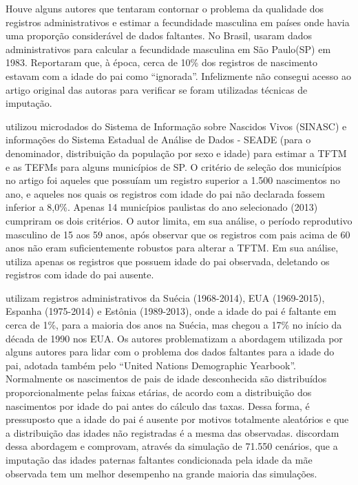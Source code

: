 Houve alguns autores que tentaram contornar o problema da qualidade dos registros administrativos e estimar a fecundidade masculina em países onde havia uma proporção considerável de dados faltantes. No Brasil,  usaram dados administrativos para calcular a fecundidade
masculina em São Paulo(SP) em 1983. Reportaram que, à época, cerca de 10\% dos registros de nascimento estavam com a idade do pai como “ignorada”. Infelizmente não consegui acesso ao artigo original das autoras para verificar se foram utilizadas técnicas de imputação. 

 utilizou microdados do Sistema de Informação sobre Nascidos Vivos (SINASC) e informações do Sistema Estadual de Análise de Dados - SEADE (para o denominador, distribuição da população por sexo e idade) para estimar a TFTM e as TEFMs para alguns municípios de SP. O critério de seleção dos municípios no artigo foi aqueles que possuíam um registro superior a 1.500 nascimentos no ano, e aqueles nos quais os registros com idade do pai não declarada fossem inferior a 8,0\%. Apenas 14 municípios paulistas do ano selecionado (2013) cumpriram os dois critérios. O autor limita, em sua análise, o período reprodutivo masculino de 15 aos 59 anos, após observar que os registros com pais acima de 60 anos não eram suficientemente robustos para alterar a TFTM. Em sua análise,  utiliza apenas os registros que possuem idade do pai observada, deletando os registros com idade do pai ausente.    

 utilizam registros administrativos da
Suécia (1968-2014), EUA (1969-2015), Espanha (1975-2014) e Estônia (1989-2013), onde a idade do pai é faltante em cerca de 1\%, para a maioria dos anos na Suécia, mas chegou a 17\% no início da década de 1990 nos EUA. Os autores problematizam a abordagem utilizada por alguns autores para lidar com o problema dos dados faltantes para a idade do pai, adotada também pelo “United Nations Demographic Yearbook”\cite{unstatsu2022Nota}. Normalmente os nascimentos de pais de idade desconhecida são distribuídos proporcionalmente pelas faixas etárias, de acordo com a distribuição dos nascimentos por idade do pai antes do cálculo das taxas. Dessa forma, é pressuposto que a idade do pai é ausente por motivos totalmente aleatórios e que a distribuição das idades não registradas é a mesma das observadas.  discordam dessa abordagem e comprovam, através da simulação de 71.550 cenários, que a imputação das idades paternas faltantes condicionada pela idade da mãe observada tem um melhor desempenho na grande maioria das simulações.  

